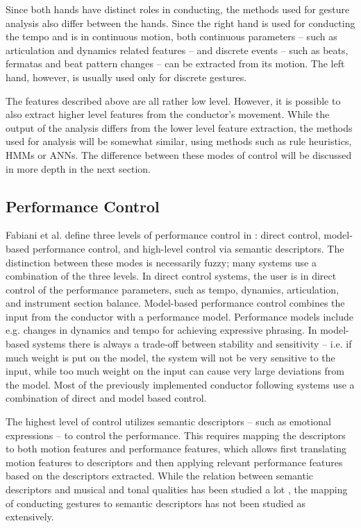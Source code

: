 Since both hands have distinct roles in conducting,
the methods used for gesture analysis also differ between the hands.
Since the right hand is used for conducting the tempo
and is in continuous motion,
both continuous parameters --
such as articulation and dynamics related features --
and discrete events --
such as beats, fermatas and beat pattern changes --
can be extracted from its motion.
The left hand, however,
is usually used only for discrete gestures.

The features described above are all rather low level.
However, it is possible to also extract
higher level features from the conductor's movement.
While the output of the analysis differs from
the lower level feature extraction,
the methods used for analysis will be somewhat similar,
using methods such as rule heuristics, HMMs or ANNs.
The difference between these modes of control
will be discussed in more depth in the next section.

\subsection{Performance Control}

Fabiani et al. define three levels of performance control in \cite{}:
direct control, model-based performance control,
and high-level control via semantic descriptors.
The distinction between these modes is necessarily fuzzy;
many systems use a combination of the three levels.
In direct control systems,
the user is in direct control of the performance parameters,
such as tempo, dynamics, articulation, and instrument section balance.
Model-based performance control combines the input from the conductor
with a performance model.
Performance models include
e.g. changes in dynamics and tempo
for achieving expressive phrasing.
In model-based systems
there is always a trade-off between stability and sensitivity --
i.e. if much weight is put on the model,
the system will not be very sensitive to the input,
while too much weight on the input
can cause very large deviations from the model.
Most of the previously implemented conductor following systems
use a combination of direct and model based control.

The highest level of control utilizes semantic descriptors --
such as emotional expressions --
to control the performance.
This requires mapping the descriptors to both motion features
and performance features,
which allows first translating motion features to
descriptors and then applying relevant performance features
based on the descriptors extracted.
While the relation between semantic descriptors
and musical and tonal qualities has been studied
a lot \cite{},
the mapping of conducting gestures to semantic descriptors
has not been studied as extensively.

